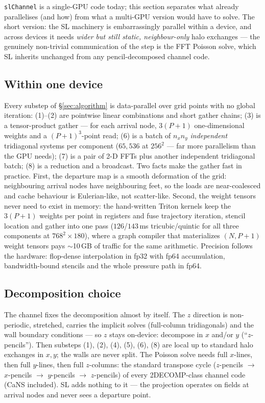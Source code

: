 \documentclass[11pt,a4paper]{article}
\begin{document}
\texttt{slChannel} is a single-GPU code today; this section separates what
already parallelises (and how) from what a multi-GPU version would have to
solve. The short version: the SL machinery is embarrassingly parallel within
a device, and across devices it needs \emph{wider but still static,
neighbour-only} halo exchanges --- the genuinely non-trivial communication of
the step is the FFT Poisson solve, which SL inherits unchanged from any
pencil-decomposed channel code.

\subsection{Within one device}

Every substep of \S\ref{sec:algorithm} is data-parallel over grid points with
no global iteration: (1)--(2) are pointwise linear combinations and
short gather chains; (3) is a tensor-product gather --- for each arrival node,
$3(P{+}1)$ one-dimensional weights and a $(P{+}1)^{3}$-point read; (6) is a
batch of $n_x n_y$ \emph{independent} tridiagonal systems per component
($65{,}536$ at $256^{2}$ --- far more parallelism than the GPU needs); (7) is
a pair of 2-D FFTs plus another independent tridiagonal batch; (8) is a
reduction and a broadcast. Two facts make the gather fast in practice. First,
the departure map is a smooth deformation of the grid: neighbouring arrival
nodes have neighbouring feet, so the loads are near-coalesced and cache
behaviour is Eulerian-like, not scatter-like. Second, the weight tensors
never need to exist in memory: the hand-written Triton kernels keep the
$3(P{+}1)$ weights per point in registers and fuse trajectory iteration,
stencil location and gather into one pass ($126$/$143$\,ms tricubic/quintic
for all three components at $768^{2}\times180$), where a graph compiler that
materializes $(N,P{+}1)$ weight tensors pays $\sim$10\,GB of traffic for the
same arithmetic. Precision follows the hardware: flop-dense interpolation in
fp32 with fp64 accumulation, bandwidth-bound stencils and the whole pressure
path in fp64.

\subsection{Decomposition choice}

The channel fixes the decomposition almost by itself. The $z$ direction is
non-periodic, stretched, carries the implicit solves (full-column
tridiagonals) and the wall boundary conditions --- so $z$ stays on-device:
decompose in $x$ and/or $y$ (``$z$-pencils''). Then substeps (1), (2), (4),
(5), (6), (8) are local up to standard halo exchanges in $x,y$; the walls are
never split. The Poisson solve needs full $x$-lines, then full $y$-lines,
then full $z$-columns: the standard transpose cycle
($z$-pencils $\to$ $x$-pencils $\to$ $y$-pencils $\to$ $z$-pencils) of every
2DECOMP-class channel code (CaNS included). SL adds nothing to it --- the
projection operates on fields at arrival nodes and never sees a departure
point.
\end{document}
